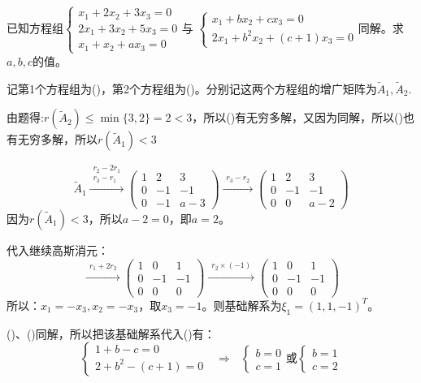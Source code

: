\documentclass[a4paper]{report}
\begin{document}
\EX 已知方程组$
\begin{cases}
x_1+2x_2+3x_3=0\\
2x_1+3x_2+5x_3=0\\
x_1+x_2+ax_3=0
\end{cases}
$与
$
\begin{cases}
x_1+bx_2+cx_3=0\\
2x_1+b^2x_2+(c+1)x_3=0
\end{cases}
$同解。求$a,b,c$的值。

\begin{jie}
记第1个方程组为(\uppercase\expandafter{})，第2个方程组为(\uppercase\expandafter{})。分别记这两个方程组的增广矩阵为$\widetilde{A}_1,\widetilde{A}_2$.

由题得:$r(\widetilde{A}_2)\leq\min\{3,2\}=2<3$，所以(\uppercase\expandafter{})有无穷多解，又因为同解，所以(\uppercase\expandafter{})也有无穷多解，所以$r(\widetilde{A}_1)<3$

\begin{equation*}
\widetilde{A}_1\xrightarrow{\substack{r_2-2r_1\\ r_3-r_1}}
{\begin{pmatrix}
1&2&3\\
0&-1&-1\\
0&-1&a-3\end{pmatrix}
}\xrightarrow{\substack{r_3-r_2}}
{\begin{pmatrix}
1&2&3\\
0&-1&-1\\
0&0&a-2\end{pmatrix}
}
\end{equation*}
因为$r(\widetilde{A}_1)<3$，所以$a-2=0$，即$a=2$。

代入继续高斯消元：
\begin{equation*}
\xrightarrow{\substack{r_1+2r_2}}
{
\begin{pmatrix}
1&0&1\\
0&-1&-1\\
0&0&0
\end{pmatrix}
}\xrightarrow{\substack{r_2\times(-1)}}
{
\begin{pmatrix}
1&0&1\\
0&-1&-1\\
0&0&0
\end{pmatrix}
}
\end{equation*}
所以：$x_1=-x_3,x_2=-x_3$，取$x_3=-1$。则基础解系为$\xi_1=(1,1,-1)^T$。

(\uppercase\expandafter{})、(\uppercase\expandafter{})同解，所以把该基础解系代入(\uppercase\expandafter{})有：
\begin{equation*}
\begin{cases}
1+b-c=0\\
2+b^2-(c+1)=0
\end{cases}~~~\Rightarrow~~~
\begin{cases}
b=0\\
c=1
\end{cases}\text{或}
\begin{cases}
b=1\\
c=2
\end{cases}
\end{equation*}


\end{jie}
\end{document}
